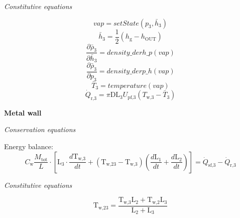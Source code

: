 \documentclass[11pt]{article} %
\begin{document}
\begin{center}
\textit{Constitutive equations}\\
\end{center}

\begin{equation}
vap = setState(p_\text{3},\bar{h}_\text{3})
\end{equation}
\begin{equation}
\bar{h}_\text{3} = \frac{1}{2}(h_\text{g} - h_\text{OUT})
\end{equation}
\begin{equation}
\frac{\partial \bar{\rho}_\text{3}}{\partial \bar{h}_\text{3}}= density\_derh\_p(vap)
\end{equation}
\begin{equation}
\frac{\partial \bar{\rho}_\text{3}}{\partial p_\text{3}}= density\_derp\_h(vap)
\end{equation}
\begin{equation}
\bar{T}_\text{3} = temperature(vap)
\end{equation}
\begin{equation}
\dot{Q}_\text{r,3} = \pi \text{D} \text{L}_\text{3} U_\text{pf,3} (T_\text{w,3} - \bar{T}_\text{3})
\end{equation}

{\bf Metal wall}\\
\begin{center}
\textit{Conservation equations}
\end{center}
Energy balance:
\begin{equation}
C_\text{w}\frac{M_\text{tot}}{L} \cdot [ \text{L}_\text{3} \cdot  \frac{d \text{T}_\text{w,3}}{d t} + (\text{T}_\text{w,23} - \text{T}_\text{w,3})  (\frac{d \text{L}_\text{1}}{d t} + \frac{d \text{L}_\text{2}}{d t})]= \dot{Q}_\text{sf,3} - \dot{Q}_\text{r,3}
\end{equation}

\begin{center}
\textit{Constitutive equations}
\end{center}

\begin{equation}
\text{T}_\text{w,23} = \frac{   \text{T}_\text{w,3} \text{L}_\text{2}  + \text{T}_\text{w,2}\text{L}_\text{3}      }{  \text{L}_\text{2} + \text{L}_\text{3}         } 
\end{equation}
\end{document}
